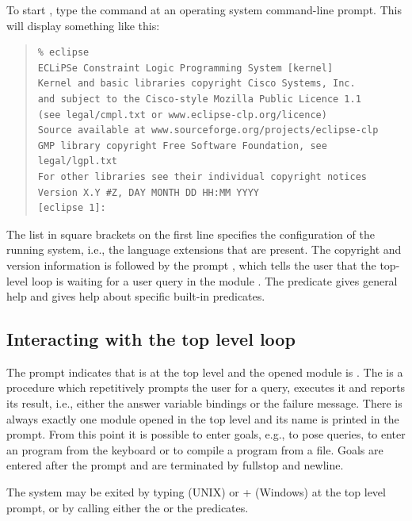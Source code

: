 To start {\eclipse}, type the command  at an
operating system command-line prompt.
This will display something like this:
\begin{quote}
\begin{verbatim}
% eclipse
ECLiPSe Constraint Logic Programming System [kernel]
Kernel and basic libraries copyright Cisco Systems, Inc.
and subject to the Cisco-style Mozilla Public Licence 1.1
(see legal/cmpl.txt or www.eclipse-clp.org/licence)
Source available at www.sourceforge.org/projects/eclipse-clp
GMP library copyright Free Software Foundation, see legal/lgpl.txt
For other libraries see their individual copyright notices
Version X.Y #Z, DAY MONTH DD HH:MM YYYY
[eclipse 1]:
\end{verbatim}
\end{quote}
The list in square brackets on the first line specifies the configuration
of the running system, i.e., the language extensions that are present.
The copyright and version information is followed by the prompt
\notation{[eclipse 1]:}, which tells the user that the top-level loop is waiting
for a user query in the module .
The predicate  gives
general help and  gives
help about specific built-in predicates.

\subsection{Interacting with the top level loop}

The {\eclipse} prompt \notation{[eclipse 1]:} indicates that {\eclipse}
is at the top level
and the opened module is .
The  is a procedure which repetitively
prompts the user for a query, executes it and reports its
result, i.e., either the answer variable bindings or the
failure message.
There is always exactly one module opened in the top level
and its name is printed in the prompt.
From this point it is possible to enter {\eclipse} goals, e.g., to
pose queries, to enter an {\eclipse} program from the keyboard
or to compile a program from a file.
Goals are entered after the prompt and are terminated by fullstop and
newline.

The {\eclipse} system may be exited by typing  (UNIX) or
 +  (Windows) at the top level prompt,
or by calling either the 
or the  predicates.

